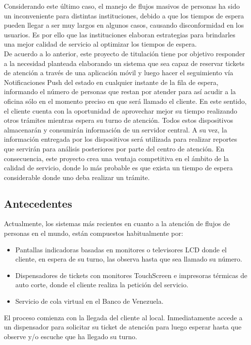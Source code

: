 Considerando este último caso, el manejo de flujos masivos de personas ha sido un inconveniente para distintas instituciones, debido a que los tiempos de espera pueden llegar a ser muy largos en algunos casos, causando disconformidad en los usuarios. Es por ello que las instituciones elaboran estrategias para brindarles una mejor calidad de servicio al optimizar los tiempos de espera.\\

De acuerdo a lo anterior, este proyecto de titulación tiene por objetivo responder a la necesidad planteada elaborando un sistema que sea capaz de reservar tickets de atención a través de una aplicación móvil y luego hacer el seguimiento vía Notificaciones Push del estado en cualquier instante de la fila de espera, informando el número de personas que restan por atender para así acudir a la oficina sólo en el momento preciso en que será llamado el cliente. En este sentido, el cliente cuenta con la oportunidad de aprovechar mejor su tiempo realizando otros trámites mientras espera su turno de atención. Todos estos dispositivos almacenarán y consumirán información de un servidor central. A su vez, la información entregada por los dispositivos será utilizada para realizar reportes que servirán para análisis posteriores por parte del centro de atención. En consecuencia, este proyecto crea una ventaja competitiva en el ámbito de la calidad de servicio, donde lo más probable es que exista un tiempo de espera considerable donde uno deba realizar un trámite.\\



\subsection{Antecedentes}

Actualmente, los sistemas más recientes en cuanto a la atención de flujos de personas en el mundo, están compuestos habitualmente por:
\begin{itemize}
\item Pantallas indicadoras basadas en monitores o televisores LCD donde el cliente, en espera de su turno, las observa hasta que sea llamado su número.
\item Dispensadores de tickets con monitores TouchScreen e impresoras térmicas de auto corte, donde el cliente realiza la petición del servicio.
\item Servicio de cola virtual en el Banco de Venezuela.
\end{itemize}
El proceso comienza con la llegada del cliente al local. Inmediatamente accede a un dispensador para solicitar su ticket de atención para luego esperar hasta que observe y/o escuche que ha llegado su turno.\\

